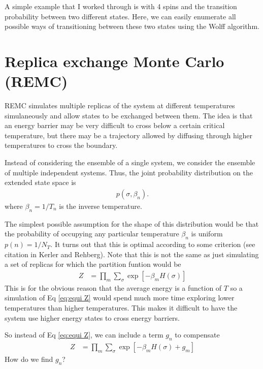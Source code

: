 \documentclass[11pt]{amsart}
\begin{document}
A simple example that I worked through is with 4 spins and the transition probability between two different states. Here, we can easily enumerate all possible ways of transitioning between these two states using the Wolff algorithm.

\section{Replica exchange Monte Carlo (REMC)}
REMC simulates multiple replicas of the system at different temperatures simulaneously and allow states to be exchanged between them. The idea is that an energy barrier may be very difficult to cross below a certain critical temperature, but there may be a trajectory allowed by diffusing through higher temperatures to cross the boundary.

Instead of considering the ensemble of a single system, we consider the ensemble of multiple independent systems. Thus, the joint probability distribution on the extended state space is
\begin{align}
	p(\sigma,\beta_n).
\end{align}
where $\beta_n = 1/T_n$ is the inverse temperature.

The simplest possible assumption for the shape of this distribution would be that the probability of occupying any particular temperature $\beta_n$ is uniform $p(n) = 1/N_T$. It turns out that this is optimal according to some criterion (see citation in Kerler and Rehberg). Note that this is not the same as just simulating a set of replicas for which the partition funtion would be
\begin{align}
	Z &= \prod_{m} \sum_\sigma \exp\left[ -\beta_m H(\sigma) \right] \label{eq:equi Z}
\end{align}
This is for the obvious reason that the average energy is a function of $T$ so a simulation of Eq \ref{eq:equi Z} would spend much more time exploring lower temperatures than higher temperatures. This makes it difficult to have the system use higher energy states to cross energy barriers. 

So instead of Eq \ref{eq:equi Z}, we can include a term $g_n$ to compensate
\begin{align}
	Z &= \prod_{m} \sum_\sigma \exp\left[ -\beta_m H(\sigma) +g_m \right]
\end{align}
How do we find $g_n$?
\end{document}
